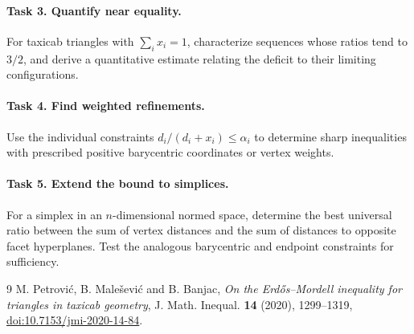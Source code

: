 \documentclass[11pt]{article}
\begin{document}
\paragraph{Task 3. Quantify near equality.}
For taxicab triangles with \(\sum_i x_i=1\), characterize sequences
whose ratios tend to \(3/2\), and derive a quantitative estimate
relating the deficit to their limiting configurations.

\paragraph{Task 4. Find weighted refinements.}
Use the individual constraints
\(d_i/(d_i+x_i)\leq\alpha_i\) to determine sharp inequalities with
prescribed positive barycentric coordinates or vertex weights.

\paragraph{Task 5. Extend the bound to simplices.}
For a simplex in an \(n\)-dimensional normed space, determine the best
universal ratio between the sum of vertex distances and the sum of
distances to opposite facet hyperplanes. Test the analogous
barycentric and endpoint constraints for sufficiency.

\begin{thebibliography}{9}
M. Petrovi\'c, B. Male\v sevi\'c and B. Banjac,
\emph{On the Erd\H{o}s--Mordell inequality for triangles in taxicab geometry},
J. Math. Inequal. \textbf{14} (2020), 1299--1319,
\href{https://doi.org/10.7153/jmi-2020-14-84}{doi:10.7153/jmi-2020-14-84}.
\end{thebibliography}
\end{document}
